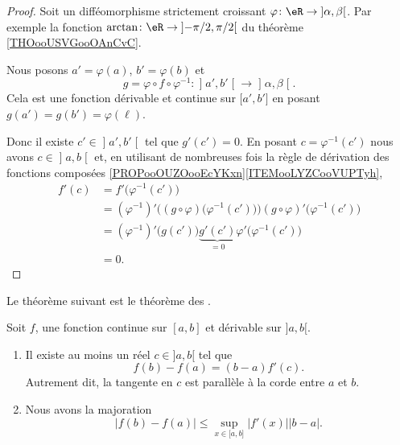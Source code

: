 \begin{proof}
    Soit un difféomorphisme strictement croissant \( \varphi\colon \eR\to \mathopen] \alpha , \beta \mathclose[\). Par exemple la fonction \( \arctan\colon \eR\to \mathopen] -\pi/2 , \pi/2 \mathclose[\) du théorème \ref{THOooUSVGooOAnCvC}.

    Nous posons \( a'=\varphi(a)\), \( b'=\varphi(b)\) et 
    \begin{equation}
    g= \varphi\circ f\circ \varphi^{-1}\colon \mathopen] a' , b' \mathclose[\to \mathopen] \alpha , \beta \mathclose[.
    \end{equation}
    Cela est une fonction dérivable et continue sur \( \mathopen[ a' , b' \mathclose]\) en posant \( g(a')=g(b')=\varphi(\ell)\).

Donc il existe \( c'\in\mathopen] a' , b' \mathclose[\) tel que \( g'(c')=0\). En posant \( c=\varphi^{-1}(c')\) nous avons \( c\in \mathopen] a , b \mathclose[\) et, en utilisant de nombreuses fois la règle de dérivation des fonctions composées \ref{PROPooOUZOooEcYKxn}\ref{ITEMooLYZCooVUPTyh},
    \begin{subequations}
        \begin{align}
            f'(c)&=f'\big( \varphi^{-1}(c') \big)\\
            &=(\varphi^{-1})'\Big( (g\circ \varphi)\big( \varphi^{-1}(c') \big) \Big)(g\circ\varphi)'\big( \varphi^{-1}(c') \big)\\
            &=(\varphi^{-1})'\big( g(c') \big)\underbrace{g'(c')}_{=0}\varphi'\big( \varphi^{-1}(c') \big)\\
            &=0.
        \end{align}
    \end{subequations}
\end{proof}

Le théorème suivant est le théorème des .
\begin{theorem}       \label{ThoAccFinis}
    Soit $f$, une fonction continue sur $[a,b]$ et dérivable sur $]a,b[$. 
        \begin{enumerate}
            \item       \label{ITEMooFZONooXJqLyX}
               Il existe au moins un réel $c\in]a,b[$ tel que 
                   \begin{equation}
                   f(b)-f(a)=(b-a)f'(c) .
                   \end{equation}
                   Autrement dit, la tangente en \( c\) est parallèle à la corde entre \( a\) et \( b\).
               \item       \label{ITEMooXRQKooDBFpdQ}
               Nous avons la majoration
               \begin{equation}
                   \big| f(b)-f(a) \big|\leq \sup_{x\in\mathopen[ a , b \mathclose]}| f'(x) |  | b-a |.
               \end{equation}
        \end{enumerate}
\end{theorem}

